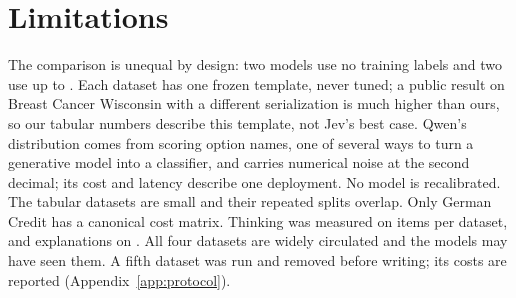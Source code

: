 \section{Limitations}
\label{sec:limitations}

The comparison is unequal by design: two models use no training labels and two use up to
\NTrainAgnews. Each dataset has one frozen template, never tuned; a public result on Breast
Cancer Wisconsin with a different serialization is much higher than ours, so our tabular numbers
describe this template, not Jev's best case. Qwen's distribution comes from scoring option names,
one of several ways to turn a generative model into a classifier, and carries numerical noise at
the second decimal; its cost and latency describe one deployment. No model is recalibrated. The
tabular datasets are small and their repeated splits overlap. Only German Credit has a canonical
cost matrix. Thinking was measured on \ThinkSubsampleN{} items per dataset, and explanations on
\ExExamplesGerman. All four datasets are widely circulated and the models may have seen them. A
fifth dataset was run and removed before writing; its costs are reported
(Appendix~\ref{app:protocol}).
